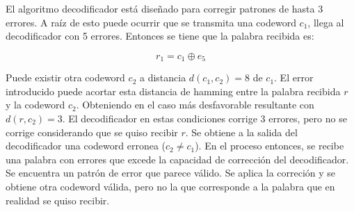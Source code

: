 El algoritmo decodificador está diseñado para corregir patrones de hasta 3 errores. A raíz de esto puede ocurrir que se transmita una codeword $c_{1}$, llega al decodificador con 5 errores. Entonces se tiene que la palabra recibida es:

$$ r_{1} = c_{1} \oplus e_{5} $$

Puede existir otra codeword $c_{2}$ a distancia $d(c_{1}, c_{2})= 8$ de $c_{1}$.
El error introducido puede acortar esta distancia de hamming entre la palabra recibida $r$ y la codeword $c_{2}$. Obteniendo en el caso más desfavorable resultante con $d(r, c_{2})=3$.
El decodificador en estas condiciones corrige 3 errores, pero no se corrige considerando que se quiso recibir $r$. Se obtiene a la salida del decodificador una codeword erronea ($c_{2} \neq c_{1}$).
En el proceso entonces, se recibe una palabra con errores que excede la capacidad de corrección del decodificador. Se encuentra un patrón de error que parece válido. Se aplica la correción y se obtiene otra codeword válida, pero no la que corresponde a la palabra que en realidad se quiso recibir.

